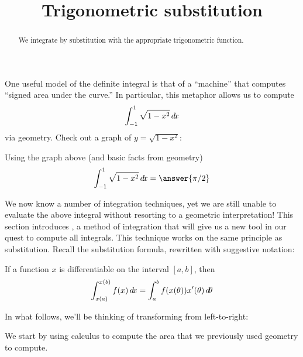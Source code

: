 \documentclass{ximera}
\title[Dig-In:]{Trigonometric substitution}
\begin{document}
\begin{abstract}
  We integrate by substitution with the appropriate trigonometric
  function.
\end{abstract}
\maketitle

One useful model of the definite integral is that of a ``machine''
that computes ``signed area under the curve.'' In particular, this
metaphor allows us to compute
\[
\int_{-1}^1 \sqrt{1-x^2} \mathop{}\!d\! x
\]
via geometry. Check out a graph of $y= \sqrt{1-x^2}$:
\begin{image}
\end{image}

\begin{question}
  Using the graph above (and basic facts from geometry)
  \[
  \int_{-1}^1 \sqrt{1-x^2} \d x = \answer{\pi/2}
  \]
\end{question}

We now know a number of integration techniques, yet we are still
unable to evaluate the above integral without resorting to a geometric
interpretation!  This section introduces ,
a method of integration that will give us a new tool in our quest to compute all integrals.
This technique works on the same principle as substitution. Recall the
substitution formula, rewritten with suggestive notation:

\begin{theorem}  
If a function $x$ is differentiable on the interval $[a,b]$, then
\[
\int_{x(a)}^{x(b)} f(x) \mathop{}\!d\! x = \int_a^b f(x(\theta)) x'(\theta) \mathop{}\!d\! \theta 
\]
\end{theorem}
In what follows, we'll be thinking of transforming from left-to-right:
\begin{image}
\end{image}
We start by using calculus to compute the area that we previously used
geometry to compute.
\end{document}
